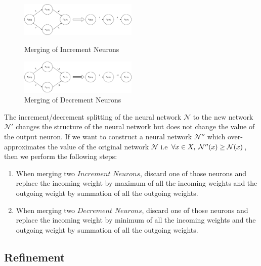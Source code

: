 \begin{figure}[H]
    \centering
    \includegraphics[width=0.5\textwidth]{diagrams/Abstraction_part1.pdf}
    \caption{Merging of Increment Neurons}
    \label{Figure: Merge1}
    \includegraphics[width=0.5\textwidth]{diagrams/Abstraction_part2.pdf}
    \caption{Merging of Decrement Neurons}
    \label{Figure: Merge2}

\end{figure} 
The increment/decrement splitting of the neural network $\mathcal{N}$ to 
the new network $\mathcal{N'}$ changes the structure of the neural network but
 does not change the value of the output neuron. If we want to construct
  a neural network $\mathcal{N}''$ which over-approximates the value of 
  the original network $\mathcal{N}$ i.e $\forall x \in X, \hspace{1mm} 
  \mathcal{N''}(x) \geq \mathcal{N}(x)$, then we perform the following steps:
\begin{enumerate}
    \item When merging two $\textit{Increment Neurons}$, discard one of those neurons and replace the incoming weight by maximum of all the incoming weights and the outgoing weight by summation of all the outgoing weights. 
    \item When merging two $\textit{Decrement Neurons}$, discard one of those neurons and replace the incoming weight by minimum of all the incoming weights and the outgoing weight by summation of all the outgoing weights. 
\end{enumerate}


\subsection{Refinement }

